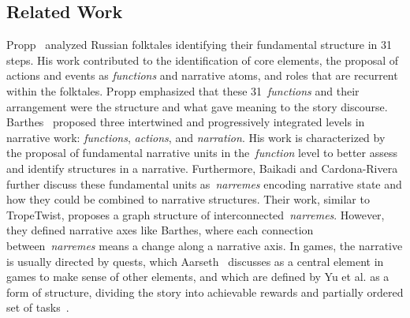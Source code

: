 \subsection{Related Work}





Propp~\cite{p12propp1975-morphology} analyzed Russian folktales identifying their fundamental structure in 31 steps. His work contributed to the identification of core elements, the proposal of actions and events as \emph{functions} and narrative atoms, and roles that are recurrent within the folktales. Propp emphasized that these 31~\emph{functions} and their arrangement were the structure and what gave meaning to the story discourse. Barthes~\cite{p12Barthes75-introStructNarr} proposed three intertwined and progressively integrated levels in narrative work: \emph{functions}, \emph{actions}, and \emph{narration}. His work is characterized by the proposal of fundamental narrative units in the~\emph{function} level to better assess and identify structures in a narrative. Furthermore, Baikadi and Cardona-Rivera~\cite{p12Baikadi2012-Narreme} further discuss these fundamental units as~\emph{narremes} encoding narrative state and how they could be combined to narrative structures. Their work, similar to TropeTwist, proposes a graph structure of interconnected~\emph{narremes}. However, they defined narrative axes like Barthes, where each connection between~\emph{narremes} means a change along a narrative axis. In games, the narrative is usually directed by quests, which Aarseth~\cite{p12aarseth2005hunt} discusses as a central element in games to make sense of other elements, and which are defined by Yu et al. as a form of structure, dividing the story into achievable rewards and partially ordered set of tasks~\cite{p12yu2020quest}.



